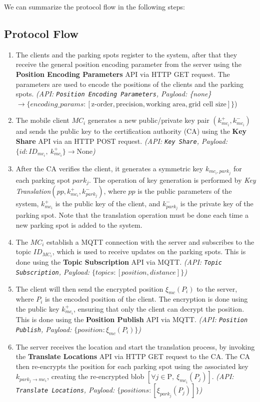 We can summarize the protocol flow in the following steps:

\subsection{Protocol Flow}
\begin{enumerate}
    \item The clients and the parking spots register to the system, after that they receive the general position encoding parameter from the server using the \textbf{Position Encoding Parameters} API via HTTP GET request. The parameters are used to encode the positions of the clients and the parking spots. \emph{(API: \texttt{Position Encoding Parameters}, Payload: \{none\} $\to \{encoding\_params: [\text{z-order}, \text{precision}, \text{working area}, \text{grid cell size}]\}$})
    \item The mobile client $MC_i$ generates a new public/private key pair $(k_{mc_i}^+, k_{mc_i}^-)$ and sends the public key to the certification authority (CA) using the \textbf{Key Share} API via an HTTP POST request. \emph{(API: \texttt{Key Share}, Payload: $\{id: ID_{mc_i},\ k_{mc_i}^+\} \to { \text{None} }$)}
    \item After the CA verifies the client, it generates a symmetric key $k_{mc_i, park_j}$ for each parking spot $park_j$. The operation of key generation is performed by \emph{Key Translation}$(pp, k_{mc_i}^+, k_{park_j}^-)$, where $pp$ is the public parameters of the system, $k_{mc_i}^+$ is the public key of the client, and $k_{park_j}^-$ is the private key of the parking spot. Note that the translation operation must be done each time a new parking spot is added to the system.
    \item The $MC_i$ establish a MQTT connection with the server and subscribes to the topic $ID_{MC_i}$, which is used to receive updates on the parking spots. This is done using the \textbf{Topic Subscription} API via MQTT. \emph{(API: \texttt{Topic Subscription}, Payload: $\{topics: [position, distance]\}$)}
    \item The client will then send the encrypted position $\xi_{mc}(P_i)$ to the server, where $P_i$ is the encoded position of the client. The encryption is done using the public key $k_{mc_i}^+$, ensuring that only the client can decrypt the position. This is done using the \textbf{Position Publish} API via MQTT. \emph{(API: \texttt{Position Publish}, Payload: $\{position: \xi_{mc}(P_i)\}$)}
    \item The server receives the location and start the translation process, by invoking the \textbf{Translate Locations} API via HTTP GET request to the CA. The CA then re-encrypts the position for each parking spot using the associated key $k_{park_j \to mc_i}$, creating the re-encrypted blob $[\forall j \in \text{P},\ \xi_{mc_i}(P_j)]$. \emph{(API: \texttt{Translate Locations}, Payload: $\{positions: [\xi_{park_j}(P_j)]\}$)}

\end{enumerate}
